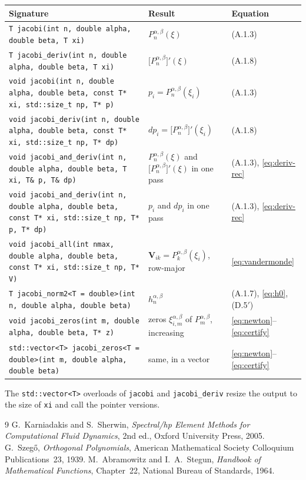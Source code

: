 \documentclass[11pt,a4paper]{article}
\newcommand{\Pab}[1]{P_{#1}^{\alpha,\beta}}     %
\newcommand{\code}[1]{\texttt{#1}}
\begin{document}
\begin{center}
\small
\begin{tabular}{@{}>{\raggedright\arraybackslash}p{}>{\raggedright\arraybackslash}p{}l@{}}
\toprule
Signature & Result & Equation \\
\midrule
\code{T jacobi(int n, double alpha, double beta, T xi)}
  & $\Pab{n}(\xi)$ & (A.1.3) \\
\code{T jacobi\_deriv(int n, double alpha, double beta, T xi)}
  & $\bigl[\Pab{n}\bigr]'(\xi)$ & (A.1.8) \\
\code{void jacobi(int n, double alpha, double beta, const T* xi, std::size\_t np, T* p)}
  & $p_i=\Pab{n}(\xi_i)$ & (A.1.3) \\
\code{void jacobi\_deriv(int n, double alpha, double beta, const T* xi, std::size\_t np, T* dp)}
  & $dp_i=\bigl[\Pab{n}\bigr]'(\xi_i)$ & (A.1.8) \\
\code{void jacobi\_and\_deriv(int n, double alpha, double beta, T xi, T\& p, T\& dp)}
  & $\Pab{n}(\xi)$ and $\bigl[\Pab{n}\bigr]'(\xi)$ in one pass & (A.1.3), \eqref{eq:deriv-rec} \\
\code{void jacobi\_and\_deriv(int n, double alpha, double beta, const T* xi, std::size\_t np, T* p, T* dp)}
  & $p_i$ and $dp_i$ in one pass & (A.1.3), \eqref{eq:deriv-rec} \\
\code{void jacobi\_all(int nmax, double alpha, double beta, const T* xi, std::size\_t np, T* V)}
  & $\mathbf{V}_{ik}=\Pab{k}(\xi_i)$, row-major & \eqref{eq:vandermonde} \\
\code{T jacobi\_norm2<T = double>(int n, double alpha, double beta)}
  & $h_n^{\alpha,\beta}$ & (A.1.7), \eqref{eq:h0}, (D.5$'$) \\
\code{void jacobi\_zeros(int m, double alpha, double beta, T* z)}
  & zeros $\xi^{\alpha,\beta}_{i,m}$ of $\Pab{m}$, increasing & \eqref{eq:newton}--\eqref{eq:certify} \\
\code{std::vector<T> jacobi\_zeros<T = double>(int m, double alpha, double beta)}
  & same, in a vector & \eqref{eq:newton}--\eqref{eq:certify} \\
\bottomrule
\end{tabular}
\end{center}
The \code{std::vector<T>} overloads of \code{jacobi} and \code{jacobi\_deriv}
resize the output to the size of \code{xi} and call the pointer versions.

\begin{thebibliography}{9}
  G.~Karniadakis and S.~Sherwin,
  \emph{Spectral/hp Element Methods for Computational Fluid Dynamics},
  2nd ed., Oxford University Press, 2005.
  G.~Szeg\H{o},
  \emph{Orthogonal Polynomials},
  American Mathematical Society Colloquium Publications~23, 1939.
  M.~Abramowitz and I.~A.~Stegun,
  \emph{Handbook of Mathematical Functions}, Chapter~22,
  National Bureau of Standards, 1964.
\end{thebibliography}
\end{document}
